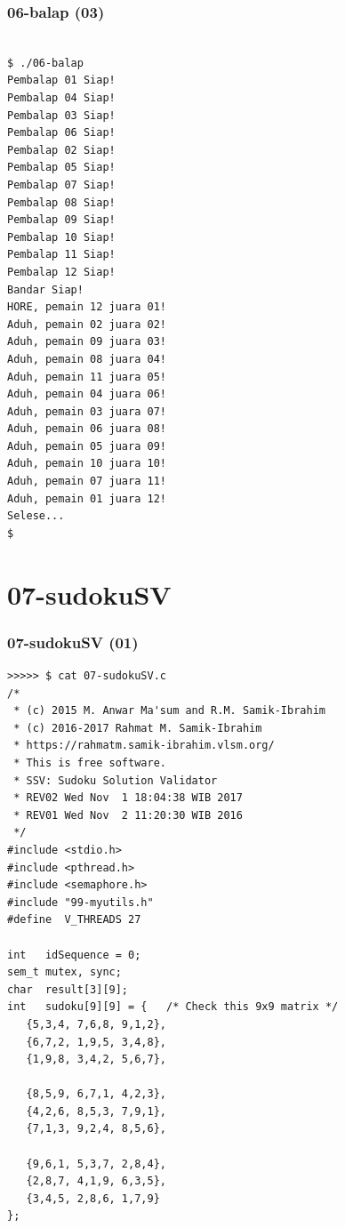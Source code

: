 \documentclass[xcolor=table, notheorems, hyperref={pdfpagelabels=false}]{beamer}
\begin{document}
\begin{frame}[fragile]
\frametitle{06-balap (03)}
\begin{lstlisting}[basicstyle=\ttfamily\tiny]

$ ./06-balap 
Pembalap 01 Siap!
Pembalap 04 Siap!
Pembalap 03 Siap!
Pembalap 06 Siap!
Pembalap 02 Siap!
Pembalap 05 Siap!
Pembalap 07 Siap!
Pembalap 08 Siap!
Pembalap 09 Siap!
Pembalap 10 Siap!
Pembalap 11 Siap!
Pembalap 12 Siap!
Bandar Siap!
HORE, pemain 12 juara 01!
Aduh, pemain 02 juara 02!
Aduh, pemain 09 juara 03!
Aduh, pemain 08 juara 04!
Aduh, pemain 11 juara 05!
Aduh, pemain 04 juara 06!
Aduh, pemain 03 juara 07!
Aduh, pemain 06 juara 08!
Aduh, pemain 05 juara 09!
Aduh, pemain 10 juara 10!
Aduh, pemain 07 juara 11!
Aduh, pemain 01 juara 12!
Selese...
$ 

\end{lstlisting}
\end{frame}

\section{07-sudokuSV}
\begin{frame}[fragile]
\frametitle{07-sudokuSV (01)}
\begin{lstlisting}[basicstyle=\ttfamily\tiny]
>>>>> $ cat 07-sudokuSV.c
/*
 * (c) 2015 M. Anwar Ma'sum and R.M. Samik-Ibrahim
 * (c) 2016-2017 Rahmat M. Samik-Ibrahim
 * https://rahmatm.samik-ibrahim.vlsm.org/
 * This is free software.
 * SSV: Sudoku Solution Validator 
 * REV02 Wed Nov  1 18:04:38 WIB 2017
 * REV01 Wed Nov  2 11:20:30 WIB 2016
 */
#include <stdio.h> 
#include <pthread.h>
#include <semaphore.h>
#include "99-myutils.h"
#define  V_THREADS 27

int   idSequence = 0;
sem_t mutex, sync;
char  result[3][9];
int   sudoku[9][9] = {   /* Check this 9x9 matrix */
   {5,3,4, 7,6,8, 9,1,2},
   {6,7,2, 1,9,5, 3,4,8},
   {1,9,8, 3,4,2, 5,6,7},

   {8,5,9, 6,7,1, 4,2,3},
   {4,2,6, 8,5,3, 7,9,1},
   {7,1,3, 9,2,4, 8,5,6},

   {9,6,1, 5,3,7, 2,8,4},
   {2,8,7, 4,1,9, 6,3,5},
   {3,4,5, 2,8,6, 1,7,9}
};

\end{lstlisting}
\end{frame}
\end{document}
